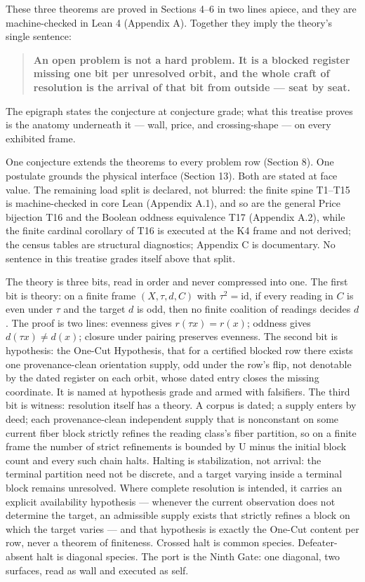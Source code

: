 \documentclass[10pt]{article}
\renewcommand{\_}{\origunderscore\allowbreak}
\begin{document}
These three theorems are proved in Sections 4--6 in two lines apiece,
and they are machine-checked in Lean 4 (Appendix A). Together they imply
the theory's single sentence:

\begin{quote}
\textbf{An open problem is not a hard problem. It is a blocked register
missing one bit per unresolved orbit, and the whole craft of resolution
is the arrival of that bit from outside --- seat by seat.}
\end{quote}

The epigraph states the conjecture at conjecture grade; what this
treatise proves is the anatomy underneath it --- wall, price, and
crossing-shape --- on every exhibited frame.

One conjecture extends the theorems to every problem row (Section 8).
One postulate grounds the physical interface (Section 13). Both are
stated at face value. The remaining load split is declared, not blurred:
the finite spine T1--T15 is machine-checked in core Lean (Appendix A.1),
and so are the general Price bijection T16 and the Boolean oddness
equivalence T17 (Appendix A.2), while the finite cardinal corollary of
T16 is executed at the K4 frame and not derived; the census tables are
structural diagnostics; Appendix C is documentary. No sentence in this
treatise grades itself above that split.

The theory is three bits, read in order and never compressed into one.
The first bit is theory: on a finite frame \((X,\tau,d,C)\) with
\(\tau^2=\mathrm{id}\), if every reading in \(C\) is even under \(\tau\)
and the target \(d\) is odd, then no finite coalition of readings
decides \(d\). The proof is two lines: evenness gives
\(r(\tau x)=r(x)\); oddness gives \(d(\tau x)\ne d(x)\); closure under
pairing preserves evenness. The second bit is hypothesis: the One-Cut
Hypothesis, that for a certified blocked row there exists one
provenance-clean orientation supply, odd under the row's flip, not
denotable by the dated register on each orbit, whose dated entry closes
the missing coordinate. It is named at hypothesis grade and armed with
falsifiers. The third bit is witness: resolution itself has a theory. A
corpus is dated; a supply enters by deed; each provenance-clean
independent supply that is nonconstant on some current fiber block
strictly refines the reading class's fiber partition, so on a finite
frame the number of strict refinements is bounded by
\textbar U\textbar{} minus the initial block count and every such chain
halts. Halting is stabilization, not arrival: the terminal partition
need not be discrete, and a target varying inside a terminal block
remains unresolved. Where complete resolution is intended, it carries an
explicit availability hypothesis --- whenever the current observation
does not determine the target, an admissible supply exists that strictly
refines a block on which the target varies --- and that hypothesis is
exactly the One-Cut content per row, never a theorem of finiteness.
Crossed halt is common species. Defeater-absent halt is diagonal
species. The port is the Ninth Gate: one diagonal, two surfaces, read as
wall and executed as self.
\end{document}
